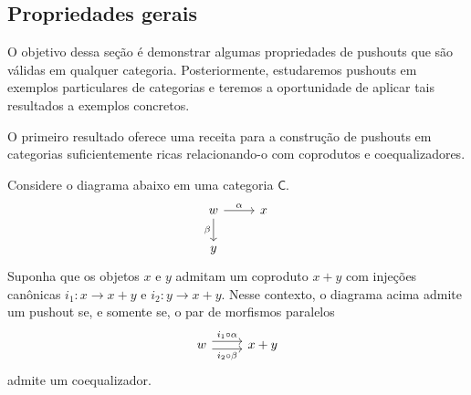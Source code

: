 \subsection{Propriedades gerais}

O objetivo dessa seção é demonstrar algumas propriedades de pushouts que são válidas em qualquer categoria.
Posteriormente, estudaremos pushouts em exemplos particulares de categorias e teremos a oportunidade de aplicar tais resultados a exemplos concretos.

O primeiro resultado oferece uma receita para a construção de pushouts em categorias suficientemente ricas relacionando-o com coprodutos e coequalizadores.

\begin{teo}
   Considere o diagrama abaixo em uma categoria $\mathsf{C}$.
   \begin{displaymath}
    \begin{tikzcd}
        w
        \arrow[r, "\alpha"]
        \arrow[d, "\beta" swap]
        & x
        \\ y
    \end{tikzcd}
   \end{displaymath}
   Suponha que os objetos $x$ e $y$ admitam um coproduto $x+y$ com injeções canônicas $i_1: x \to x + y$ e $i_2: y \to x+y$.
   Nesse contexto, o diagrama acima admite um pushout se, e somente se, o par de morfismos paralelos
   \begin{displaymath}
    \begin{tikzcd}
        w
        \arrow[r, shift left=1.25, "i_1 \circ \alpha"]
        \arrow[r, shift right=1.25, "i_2 \circ \beta" swap]
        & x+y
    \end{tikzcd}
   \end{displaymath}
   admite um coequalizador.
\end{teo}

